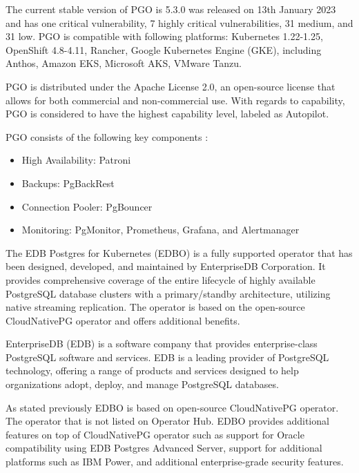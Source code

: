 The current stable version of PGO is 5.3.0 was released on 13th January 2023 and has one critical vulnerability, 7 highly critical vulnerabilities, 31 medium, and 31 low. \cite{ArtifactHubCrunchy}
PGO is compatible with following platforms: Kubernetes 1.22-1.25, OpenShift 4.8-4.11, Rancher, Google Kubernetes Engine (GKE), including Anthos, Amazon EKS, Microsoft AKS, VMware Tanzu. \cite{CrunchyDoc}

PGO is distributed under the Apache License 2.0, an open-source license that allows for both commercial and non-commercial use. With regards to capability, PGO is considered to have the highest capability level, labeled as Autopilot. \cite{OperatorHubCrunchy}

PGO consists of the following key components \cite{CrunchyPGOGit}:
\begin{itemize}
  \item High Availability: Patroni
  \item Backups: PgBackRest
  \item Connection Pooler: PgBouncer
  \item Monitoring: PgMonitor, Prometheus, Grafana, and Alertmanager
\end{itemize}


\pagebreak
{}
The EDB Postgres for Kubernetes (EDBO) is a fully supported operator that has been designed, developed, and maintained by EnterpriseDB Corporation. It provides comprehensive coverage of the entire lifecycle of highly available PostgreSQL database clusters with a primary/standby architecture, utilizing native streaming replication. The operator is based on the open-source CloudNativePG operator and offers additional benefits. \cite{OperatorHubEDB}

EnterpriseDB (EDB) is a software company that provides enterprise-class PostgreSQL software and services. EDB is a leading provider of PostgreSQL technology, offering a range of products and services designed to help organizations adopt, deploy, and manage PostgreSQL databases. \cite{EDB}

As stated previously EDBO is based on open-source CloudNativePG operator. The operator that is not listed on Operator Hub. EDBO provides additional features on top of CloudNativePG operator such as support for Oracle compatibility using EDB Postgres Advanced Server, support for additional platforms such as IBM Power, and additional enterprise-grade security features. \cite{EDBdocu}

